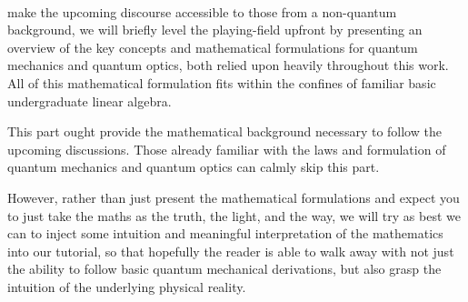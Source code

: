 \\

 make the upcoming discourse accessible to those from a non-quantum background, we will briefly level the playing-field upfront by presenting an overview of the key concepts and mathematical formulations for quantum mechanics and quantum optics, both relied upon heavily throughout this work. All of this mathematical formulation fits within the confines of familiar basic undergraduate linear algebra.

This part ought provide the mathematical background necessary to follow the upcoming discussions. Those already familiar with the laws and formulation of quantum mechanics and quantum optics can calmly skip this part.

However, rather than just present the mathematical formulations and expect you to just take the maths as the truth, the light, and the way, we will try as best we can to inject some intuition and meaningful interpretation of the mathematics into our tutorial, so that hopefully the reader is able to walk away with not just the ability to follow basic quantum mechanical derivations, but also grasp the intuition of the underlying physical reality.